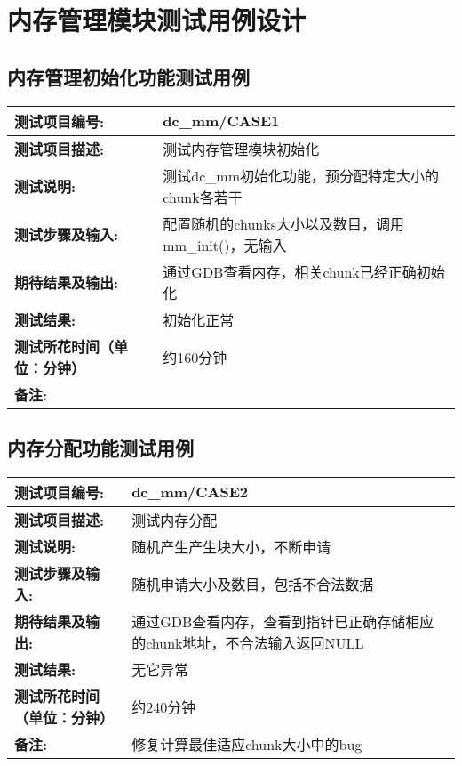 %
%
\section{内存管理模块测试用例设计}
\subsection{内存管理初始化功能测试用例}

\begin{table}[H]
\centering
\begin{tabular}{|p{8em}|p{22em}|}
\hline
\textbf{测试项目编号:}&dc\_mm/CASE1\\
\hline
\textbf{测试项目描述:}&测试内存管理模块初始化\\
\hline
\textbf{测试说明:}& 测试dc\_mm初始化功能，预分配特定大小的chunk各若干\\
\hline
\textbf{测试步骤及输入:}&配置随机的chunks大小以及数目，调用mm\_init()，无输入\\
\hline
\textbf{期待结果及输出:}&通过GDB查看内存，相关chunk已经正确初始化\\
\hline
\textbf{测试结果:}& 初始化正常\\
\hline
\textbf{测试所花时间（单位：分钟）}& 约160分钟\\
\hline
\textbf{备注:}& \\
\hline
\end{tabular}
\end{table}

\subsection {内存分配功能测试用例}
\begin{table}[H]
\centering
\begin{tabular}{|p{8em}|p{22em}|}
\hline
\textbf{测试项目编号:}&dc\_mm/CASE2\\
\hline
\textbf{测试项目描述:}&测试内存分配\\
\hline
\textbf{测试说明:}&随机产生产生块大小，不断申请\\
\hline
\textbf{测试步骤及输入:}& 随机申请大小及数目，包括不合法数据\\
\hline
\textbf{期待结果及输出:}&通过GDB查看内存，查看到指针已正确存储相应的chunk地址，不合法输入返回NULL\\
\hline
\textbf{测试结果:}&无它异常\\
\hline
\textbf{测试所花时间（单位：分钟）}& 约240分钟\\
\hline
\textbf{备注:}&修复计算最佳适应chunk大小中的bug \\
\hline
\end{tabular}
\end{table}

